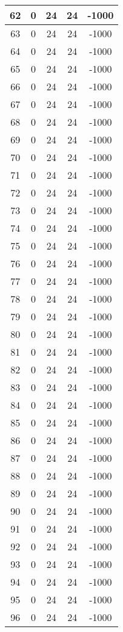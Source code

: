 \documentclass[letterpaper, 12pt]{article}
\begin{document}
\begin{longtable}{|c|c|c|c|c|}
\hline
62 & 0 & 24 & 24 & -1000 \\
\hline
63 & 0 & 24 & 24 & -1000 \\
\hline
64 & 0 & 24 & 24 & -1000 \\
\hline
65 & 0 & 24 & 24 & -1000 \\
\hline
66 & 0 & 24 & 24 & -1000 \\
\hline
67 & 0 & 24 & 24 & -1000 \\
\hline
68 & 0 & 24 & 24 & -1000 \\
\hline
69 & 0 & 24 & 24 & -1000 \\
\hline
70 & 0 & 24 & 24 & -1000 \\
\hline
71 & 0 & 24 & 24 & -1000 \\
\hline
72 & 0 & 24 & 24 & -1000 \\
\hline
73 & 0 & 24 & 24 & -1000 \\
\hline
74 & 0 & 24 & 24 & -1000 \\
\hline
75 & 0 & 24 & 24 & -1000 \\
\hline
76 & 0 & 24 & 24 & -1000 \\
\hline
77 & 0 & 24 & 24 & -1000 \\
\hline
78 & 0 & 24 & 24 & -1000 \\
\hline
79 & 0 & 24 & 24 & -1000 \\
\hline
80 & 0 & 24 & 24 & -1000 \\
\hline
81 & 0 & 24 & 24 & -1000 \\
\hline
82 & 0 & 24 & 24 & -1000 \\
\hline
83 & 0 & 24 & 24 & -1000 \\
\hline
84 & 0 & 24 & 24 & -1000 \\
\hline
85 & 0 & 24 & 24 & -1000 \\
\hline
86 & 0 & 24 & 24 & -1000 \\
\hline
87 & 0 & 24 & 24 & -1000 \\
\hline
88 & 0 & 24 & 24 & -1000 \\
\hline
89 & 0 & 24 & 24 & -1000 \\
\hline
90 & 0 & 24 & 24 & -1000 \\
\hline
91 & 0 & 24 & 24 & -1000 \\
\hline
92 & 0 & 24 & 24 & -1000 \\
\hline
93 & 0 & 24 & 24 & -1000 \\
\hline
94 & 0 & 24 & 24 & -1000 \\
\hline
95 & 0 & 24 & 24 & -1000 \\
\hline
96 & 0 & 24 & 24 & -1000 \\

\end{longtable}
\end{document}
